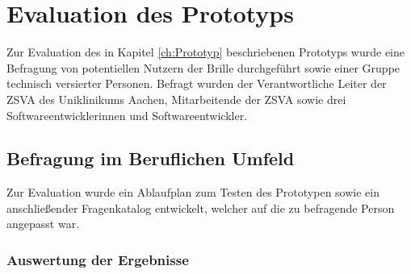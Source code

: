 %
%
%
%
%
%
\chapter{Evaluation des Prototyps}
\label{ch:Evaluation_des_Prototyps}
Zur Evaluation des in Kapitel \ref{ch:Prototyp} beschriebenen Prototyps wurde eine Befragung von potentiellen Nutzern der Brille durchgeführt sowie einer Gruppe technisch versierter Personen. Befragt wurden
der Verantwortliche Leiter der ZSVA des Uniklinikums Aachen, Mitarbeitende der ZSVA sowie drei  Softwareentwicklerinnen und Softwareentwickler.
%
%
%
%
%
%
\section{Befragung im Beruflichen Umfeld}
\label{sec:Befragung_im_Beruflichen_Umfeld}
Zur Evaluation wurde ein Ablaufplan zum Testen des Prototypen sowie ein anschließender Fragenkatalog entwickelt, welcher auf die zu befragende Person angepasst war.
%
%
%
%
%
%
\subsection{Auswertung der Ergebnisse}
\label{sec:Auswertung_der_Ergebnisse}
